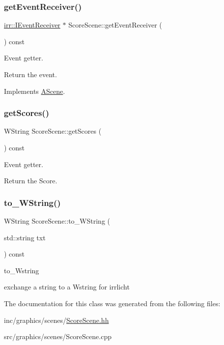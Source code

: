 \subsubsection{\texorpdfstring{get\+Event\+Receiver()}{getEventReceiver()}}
{\footnotesize\ttfamily \hyperlink{classirr_1_1IEventReceiver}{irr\+::\+I\+Event\+Receiver} $\ast$ Score\+Scene\+::get\+Event\+Receiver (\begin{DoxyParamCaption}{ }\end{DoxyParamCaption}) const\hspace{0.3cm}{\ttfamily [virtual]}}



Event getter. 

Return the event. 

Implements \hyperlink{classAScene_af521e5e6d30a5d2e5d30eb333e4d3abd}{A\+Scene}.

\mbox{\label{classScoreScene_af82d6c841dc42c42d83202d2c7ddf8c9}} 
\subsubsection{\texorpdfstring{get\+Scores()}{getScores()}}
{\footnotesize\ttfamily W\+String Score\+Scene\+::get\+Scores (\begin{DoxyParamCaption}{ }\end{DoxyParamCaption}) const}



Event getter. 

Return the Score. \mbox{\label{classScoreScene_a7cd50a0bd9be501c08f3f2855d61830e}} 
\subsubsection{\texorpdfstring{to\+\_\+\+W\+String()}{to\_WString()}}
{\footnotesize\ttfamily W\+String Score\+Scene\+::to\+\_\+\+W\+String (\begin{DoxyParamCaption}\item[{std\+::string}]{txt }\end{DoxyParamCaption}) const}



to\+\_\+\+Wstring 

exchange a string to a Wstring for irrlicht 

The documentation for this class was generated from the following files\+:\begin{DoxyCompactItemize}
\item 
inc/graphics/scenes/\hyperlink{ScoreScene_8hh}{Score\+Scene.\+hh}\item 
src/graphics/scenes/Score\+Scene.\+cpp\end{DoxyCompactItemize}

